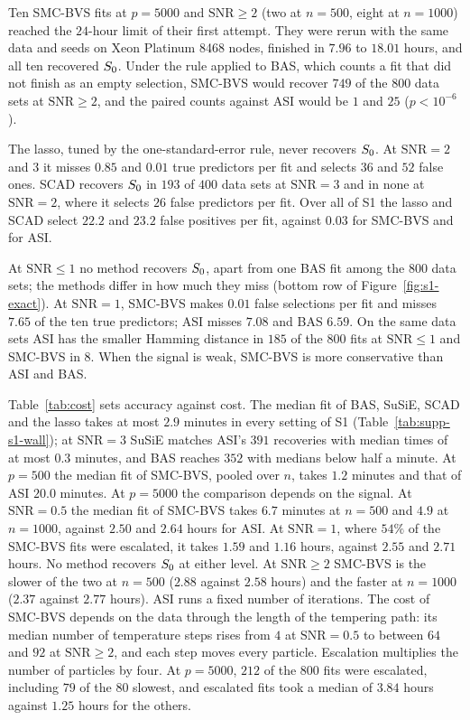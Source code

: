 Ten SMC-BVS fits at $p=5000$ and $\mathrm{SNR}\ge2$ (two at $n=500$, eight at $n=1000$) reached the $24$-hour limit
of their first attempt. They were rerun with the same data and seeds on Xeon Platinum 8468 nodes, finished in $7.96$
to $18.01$ hours, and all ten recovered $S_0$. Under the rule applied to BAS, which counts a fit that did not finish
as an empty selection, SMC-BVS would recover $749$ of the $800$ data sets at $\mathrm{SNR}\ge2$, and the paired counts
against ASI would be $1$ and $25$ ($p<10^{-6}$).

The lasso, tuned by the one-standard-error rule, never recovers $S_0$. At $\mathrm{SNR}=2$ and $3$ it misses $0.85$
and $0.01$ true predictors per fit and selects $36$ and $52$ false ones. SCAD recovers $S_0$ in $193$ of $400$ data
sets at $\mathrm{SNR}=3$ and in none at $\mathrm{SNR}=2$, where it selects $26$ false predictors per fit. Over all of
S1 the lasso and SCAD select $22.2$ and $23.2$ false positives per fit, against $0.03$ for SMC-BVS and for ASI.

At $\mathrm{SNR}\le1$ no method recovers $S_0$, apart from one BAS fit among the $800$ data sets; the methods differ
in how much they miss (bottom row of Figure~\ref{fig:s1-exact}). At $\mathrm{SNR}=1$, SMC-BVS makes $0.01$ false
selections per fit and misses $7.65$ of the ten true predictors; ASI misses $7.08$ and BAS $6.59$. On the same data
sets ASI has the smaller Hamming distance in $185$ of the $800$ fits at $\mathrm{SNR}\le1$ and SMC-BVS in $8$. When
the signal is weak, SMC-BVS is more conservative than ASI and BAS.

Table~\ref{tab:cost} sets accuracy against cost. The median fit of BAS, SuSiE, SCAD and the lasso takes at most
$2.9$ minutes in every setting of S1 (Table~\ref{tab:supp-s1-wall}); at $\mathrm{SNR}=3$ SuSiE matches ASI's $391$ recoveries with median
times of at most $0.3$ minutes, and BAS reaches $352$ with medians below half a minute. At $p=500$ the median fit of SMC-BVS, pooled over $n$, takes
$1.2$ minutes and that of ASI $20.0$ minutes. At $p=5000$ the comparison depends on the signal. At
$\mathrm{SNR}=0.5$ the median fit of SMC-BVS takes $6.7$ minutes at $n=500$ and $4.9$ at $n=1000$, against $2.50$ and
$2.64$ hours for ASI. At $\mathrm{SNR}=1$, where $54\%$ of the SMC-BVS fits were escalated, it takes $1.59$ and $1.16$
hours, against $2.55$ and $2.71$ hours. No method recovers $S_0$ at either level. At $\mathrm{SNR}\ge2$ SMC-BVS is the slower of the two at $n=500$ ($2.88$ against $2.58$ hours) and the faster
at $n=1000$ ($2.37$ against $2.77$ hours). ASI runs a fixed number of iterations. The cost of SMC-BVS depends on the
data through the length of the tempering path: its median number of temperature steps rises from $4$ at
$\mathrm{SNR}=0.5$ to between $64$ and $92$ at $\mathrm{SNR}\ge2$, and each step moves every particle. Escalation
multiplies the number of particles by four. At $p=5000$, $212$ of the $800$ fits were escalated, including $79$ of
the $80$ slowest, and escalated fits took a median of $3.84$ hours against $1.25$ hours for the others.


